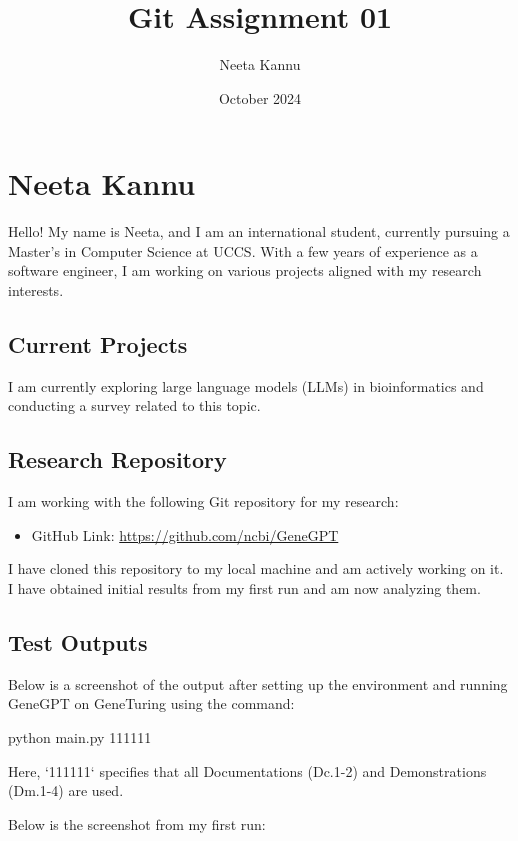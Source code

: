 ﻿\documentclass{article}
\title{Git Assignment 01}
\author{Neeta Kannu}
\date{October 2024}
\begin{document}
\maketitle

\section*{Neeta Kannu}
Hello! My name is Neeta, and I am an international student, currently pursuing a Master's in Computer Science at UCCS. With a few years of experience as a software engineer, I am working on various projects aligned with my research interests.


\subsection*{Current Projects}
I am currently exploring large language models (LLMs) in bioinformatics and conducting a survey related to this topic.

\subsection*{Research Repository}
I am working with the following Git repository for my research:

\begin{itemize}
    \item GitHub Link: \url{https://github.com/ncbi/GeneGPT}
\end{itemize}

I have cloned this repository to my local machine and am actively working on it. 
I have obtained initial results from my first run and am now analyzing them.

\subsection*{Test Outputs}
Below is a screenshot of the output after setting up the environment and running GeneGPT on GeneTuring using the command:

python main.py 111111

Here, `111111` specifies that all Documentations (Dc.1-2) and Demonstrations (Dm.1-4) are used.

Below is the screenshot from my first run:
\end{document}
